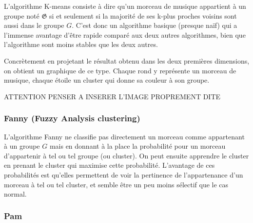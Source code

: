 \documentclass{report}
\begin{document}
L'algorithme K-means consiste à dire qu'un morceau de musique appartient à un groupe noté $\mathfrak{G}$ si et seulement si la majorité de ses k-plus proches voisins sont aussi dans le groupe $G$. C'est donc un algorithme basique (presque naïf) qui a l'immense avantage d'être rapide comparé aux deux autres algorithmes, bien que l'algorithme sont moins stables que les deux autres.

Concrètement en projetant le résultat obtenu dans les deux premières dimensions, on obtient un graphique de ce type. Chaque rond y représente un morceau de musique, chaque étoile un cluster qui donne sa couleur à son groupe.

ATTENTION PENSER A INSERER L'IMAGE PROPREMENT DITE

\subsubsection{Fanny (Fuzzy Analysis clustering)}

L'algorithme Fanny ne classifie pas directement un morceau comme appartenant à un groupe $G$ mais en donnant à la place la probabilité pour un morceau d'appartenir à tel ou tel groupe (ou cluster). On peut ensuite apprendre le cluster en prenant le cluster qui maximise cette probabilité. L'avantage de ces probabilités est qu'elles permettent de voir la pertinence de l'appartenance d'un morceau à tel ou tel cluster, et semble être un peu moins sélectif que le cas normal.

\subsubsection{Pam}
\end{document}

